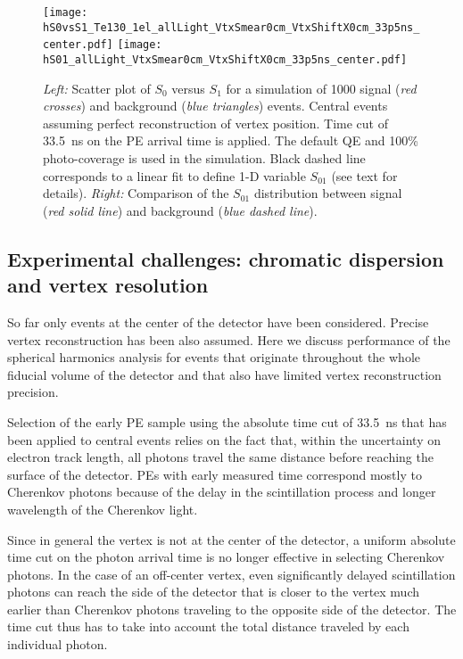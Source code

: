 \begin{figure*}[h]
  \centering
  \texttt{[image: hS0vsS1\_Te130\_1el\_allLight\_VtxSmear0cm\_VtxShiftX0cm\_33p5ns\_center.pdf]}
  \texttt{[image: hS01\_allLight\_VtxSmear0cm\_VtxShiftX0cm\_33p5ns\_center.pdf]}
  \caption{\emph{Left:} Scatter plot of $S_0$ versus $S_1$ for a simulation of 1000 signal (\emph{red crosses}) and background 
    (\emph{blue triangles}) events.
    Central events assuming perfect reconstruction of vertex position. Time cut of 33.5~ns on the PE arrival time is
    applied. The default QE and 100\% photo-coverage is used in the simulation.
    Black dashed line corresponds to a linear fit to define 1-D variable $S_{01}$ (see text for details).
    \emph{Right:} Comparison of the $S_{01}$ distribution between signal (\emph{red solid line}) and background (\emph{blue dashed line}).}
\label{fig:SL_Te_33p5ns_center}
\end{figure*}


\subsection{Experimental challenges: chromatic dispersion and vertex resolution}

So far only events at the center of the detector have been considered. Precise vertex reconstruction has been also assumed. 
Here we discuss performance of the spherical harmonics analysis for events that originate throughout the whole fiducial volume
of the detector and that also have limited vertex reconstruction precision.

Selection of the early PE sample using the absolute time cut of 33.5~ns that has been applied to central events relies on the fact that, 
within the uncertainty on electron track length, all photons travel the same distance before reaching the surface of the detector. 
PEs with early measured time correspond mostly to Cherenkov photons because of the delay in the scintillation process and longer 
wavelength of the Cherenkov light. 

Since in general the vertex is not at the center of the detector, a uniform absolute time cut on the photon arrival time is no longer 
effective in selecting Cherenkov photons. In the case of an off-center vertex, even significantly delayed scintillation photons can
reach the side of the detector that is closer to the vertex much earlier than Cherenkov photons traveling to the opposite side of the 
detector. The time cut thus has to take into account the total distance traveled by each individual photon.

